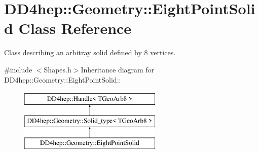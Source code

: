 \hypertarget{class_d_d4hep_1_1_geometry_1_1_eight_point_solid}{
\section{DD4hep::Geometry::EightPointSolid Class Reference}
\label{class_d_d4hep_1_1_geometry_1_1_eight_point_solid}
}


Class describing an arbitray solid defined by 8 vertices.  


{\ttfamily \#include $<$Shapes.h$>$}Inheritance diagram for DD4hep::Geometry::EightPointSolid::\begin{figure}[H]
\begin{center}
\leavevmode
\includegraphics[height=3cm]{class_d_d4hep_1_1_geometry_1_1_eight_point_solid}
\end{center}
\end{figure}
